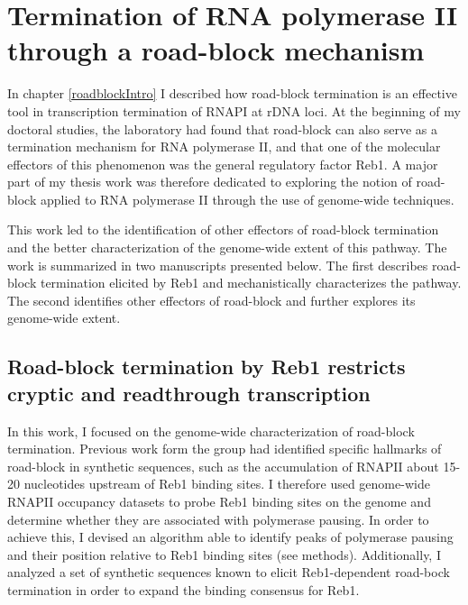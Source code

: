 \chapter{Termination of RNA polymerase II through a road-block mechanism}

In chapter \ref{roadblockIntro} I described how road-block termination is an effective tool in transcription termination of RNAPI at rDNA loci. 
At the beginning of my doctoral studies, the laboratory had found that road-block can also serve as a termination mechanism for RNA polymerase II, and that one of the molecular effectors of this phenomenon was the general regulatory factor Reb1. 
A major part of my thesis work was therefore dedicated to exploring the notion of road-block applied to RNA polymerase II through the use of genome-wide techniques.

This work led to the identification of other effectors of road-block termination and the better characterization of the genome-wide extent of this pathway. 
The work is summarized in two manuscripts presented below. 
The first describes road-block termination elicited by Reb1 and mechanistically characterizes the pathway.
The second identifies other effectors of road-block and further explores its genome-wide extent.

\section{Road-block termination by Reb1 restricts cryptic and readthrough transcription}

In this work, I focused on the genome-wide characterization of road-block termination. 
Previous work form the group had identified specific hallmarks of road-block in synthetic sequences, such as the accumulation of RNAPII about 15-20 nucleotides upstream of Reb1 binding sites. 
I therefore used genome-wide RNAPII occupancy datasets to probe Reb1 binding sites on the genome and determine whether they are associated with polymerase pausing. 
In order to achieve this, I devised an algorithm able to identify peaks of polymerase pausing and their position relative to Reb1 binding sites (see methods). 
Additionally, I analyzed a set of synthetic sequences known to elicit Reb1-dependent road-bock termination in order to expand the binding consensus for Reb1. 

\clearpage




\clearpage

